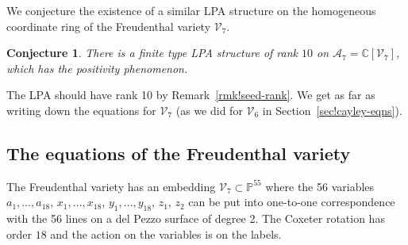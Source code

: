 \documentclass[pdftex]{sigma}
\numberwithin{equation}{section}
\newtheorem{conj}[thm]{Conjecture}
\theoremstyle{definition}
\newcommand{\CC}{\mathbb{C}}
\newcommand{\PP}{\mathbb{P}}
\begin{document}
We conjecture the existence of a similar LPA structure on the homogeneous coordinate ring of the Freudenthal variety $\mathcal V_7$.

\begin{conj}
There is a finite type LPA structure of rank $10$ on $\mathcal A_7=\CC[\mathcal V_7]$, which has the positivity phenomenon.
\end{conj}

The LPA should have rank 10 by Remark~\ref{rmk!seed-rank}. We get as far as writing down the equations for $\mathcal V_7$ (as we did for $\mathcal V_6$ in Section~\ref{sec!cayley-eqns}). %

\subsection{The equations of the Freudenthal variety}
The Freudenthal variety has an embedding $\mathcal V_7\!\!\subset\!\! \PP^{55}$ where the 56 variables $a_1,\ldots,a_{18}$, $x_1,\ldots,x_{18}$, $y_1,\ldots,y_{18}$, $z_1$, $z_2$ can be put into one-to-one correspondence with the 56 lines on a del Pezzo surface of degree 2. The Coxeter rotation has order $18$ and the action on the variables is on the labels.
\end{document}
